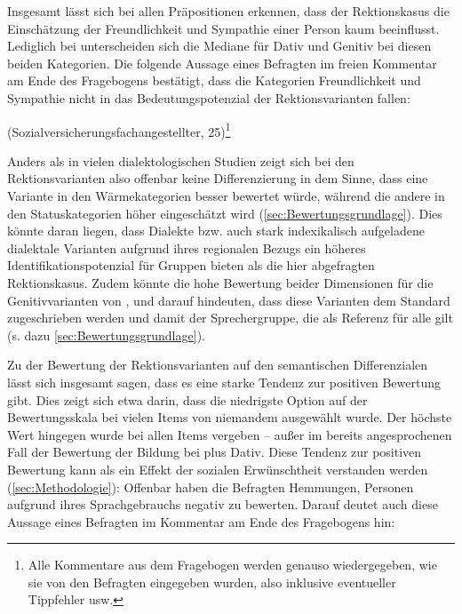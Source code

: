 Insgesamt lässt sich bei allen Präpositionen erkennen, dass der Rektionskasus die Einschätzung der Freundlichkeit und Sympathie einer Person kaum beeinflusst.
Lediglich bei \dank{} unterscheiden sich die Mediane für Dativ und Genitiv bei diesen beiden Kategorien.  
Die folgende Aussage eines Befragten im freien Kommentar am Ende des Fragebogens bestätigt, dass die Kategorien Freundlichkeit und Sympathie nicht in das Bedeutungspotenzial der Rektionsvarianten fallen: 
\begin{exe}
\ex {} (Sozialversicherungsfachangestellter, 25)\footnote{Alle Kommentare aus dem Fragebogen werden genauso wiedergegeben, wie sie von den Befragten eingegeben wurden, also inklusive eventueller Tippfehler usw.}
\end{exe}
Anders als in vielen dialektologischen Studien zeigt sich bei den Rektionsvarianten also offenbar keine Differenzierung in dem Sinne, dass eine Variante in den Wärmekategorien besser bewertet würde, während die andere in den Statuskategorien höher eingeschätzt wird (\autoref{sec:Bewertungsgrundlage}).
Dies könnte daran liegen, dass Dialekte bzw. auch stark indexikalisch aufgeladene dialektale Varianten aufgrund ihres regionalen Bezugs ein höheres Identifikationspotenzial für Gruppen bieten als die hier abgefragten Rektionskasus.
Zudem könnte die hohe Bewertung beider Dimensionen für die Genitivvarianten von \wegen, \waehrend{} und \dank{} darauf hindeuten, dass diese Varianten dem Standard zugeschrieben werden und damit der Sprechergruppe, die als Referenz für alle gilt (s. dazu \autoref{sec:Bewertungsgrundlage}). %

Zu der Bewertung der Rektionsvarianten auf den semantischen Differenzialen lässt sich insgesamt sagen, dass es eine starke Tendenz zur positiven Bewertung gibt. 
Dies zeigt sich etwa darin, dass die niedrigste Option auf der Bewertungsskala bei vielen Items von niemandem ausgewählt wurde. 
Der höchste Wert hingegen wurde bei allen Items vergeben -- außer im bereits angesprochenen Fall der Bewertung der Bildung bei \waehrend{} plus Dativ. 
Diese Tendenz zur positiven Bewertung kann als ein Effekt der sozialen Erwünschtheit verstanden werden (\autoref{sec:Methodologie}): 
Offenbar haben die Befragten Hemmungen, Personen aufgrund ihres Sprachgebrauchs negativ zu bewerten.
Darauf deutet auch diese Aussage eines Befragten im Kommentar am Ende des Fragebogens hin:

